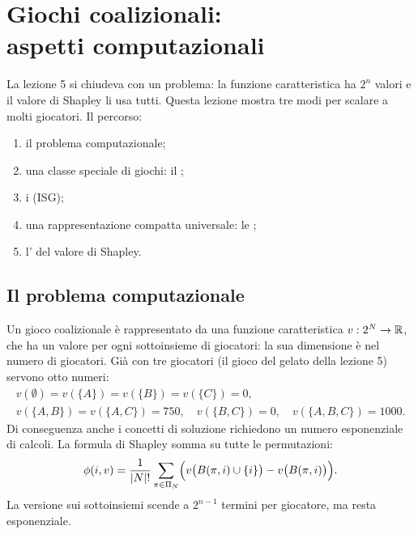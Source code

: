 \chapter[Giochi coalizionali: aspetti computazionali]{Giochi coalizionali:\\aspetti computazionali}

\parteteoria

La lezione 5 si chiudeva con un problema: la funzione caratteristica ha $2^n$ valori e il
valore di Shapley li usa tutti. Questa lezione mostra tre modi per scalare a molti giocatori.
Il percorso:
\begin{enumerate}[label=\arabic*.]
  \item il problema computazionale;
  \item una classe speciale di giochi: il ;
  \item i  (ISG);
  \item una rappresentazione compatta universale: le ;
  \item l' del valore di Shapley.
\end{enumerate}

\section{Il problema computazionale}

Un gioco coalizionale è rappresentato da una funzione caratteristica $v: 2^N \to \mathbb{R}$, che ha
un valore per ogni sottoinsieme di giocatori: la sua dimensione è  nel
numero di giocatori. Già con tre giocatori (il gioco del gelato della lezione 5) servono
otto numeri:
\[
\begin{gathered}
  v(\emptyset) = v(\{A\}) = v(\{B\}) = v(\{C\}) = 0,\\
  v(\{A,B\}) = v(\{A,C\}) = 750,\quad v(\{B,C\}) = 0,\quad v(\{A,B,C\}) = 1000.
\end{gathered}
\]
Di conseguenza anche i concetti di soluzione richiedono un numero esponenziale di calcoli.
La formula di Shapley somma su tutte le permutazioni:
\[
  \phi(i, v) = \frac{1}{|N|!} \sum_{\pi \in \Pi_N}
     \Bigl( v\bigl(B(\pi, i) \cup \{i\}\bigr) - v\bigl(B(\pi, i)\bigr) \Bigr).
\]
La versione sui sottoinsiemi scende a $2^{n-1}$ termini per giocatore, ma resta esponenziale.

